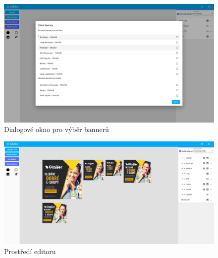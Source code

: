     \begin{figure}[h]
        \includegraphics[width=1.0\textwidth]{Figures/editor/bannery-dialog.png}
        \caption[Výběr bannerů]{Dialogové okno pro výběr bannerů}
        \label{fig:editor:banner-dialog}
    \end{figure}

    \begin{figure}[h]
        \includegraphics[width=1.0\textwidth]{Figures/editor/ad-editor-ui.png}
        \caption{Prostředí editoru}
        \label{fig:editor:editor}
    \end{figure}

